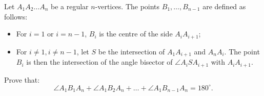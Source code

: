 Let $A_1 A_2 \ldots A_n$ be a regular $n$-vertices.
The points $B_1,\ldots,B_{n-1}$ are defined as follows:
\begin{itemize}
    \item For $i=1$ or $i=n-1$, $B_i$ is the centre of the side $A_i A_{i+1}$;
    \item For $i \neq 1, i \neq n-1$, let $S$ be the intersection of $A_1 A_{i+1}$ and $A_n A_i$.
    The point $B_i$ is then the intersection of the angle bisector of $\angle A_i S A_{i+1}$ with $A_i A_{i+1}$.
\end{itemize}
Prove that:
$$\angle A_1 B_1 A_n + \angle A_1 B_2 A_n+ \ldots + \angle A_1 B_{n-1} A_n = 180^\circ.$$
